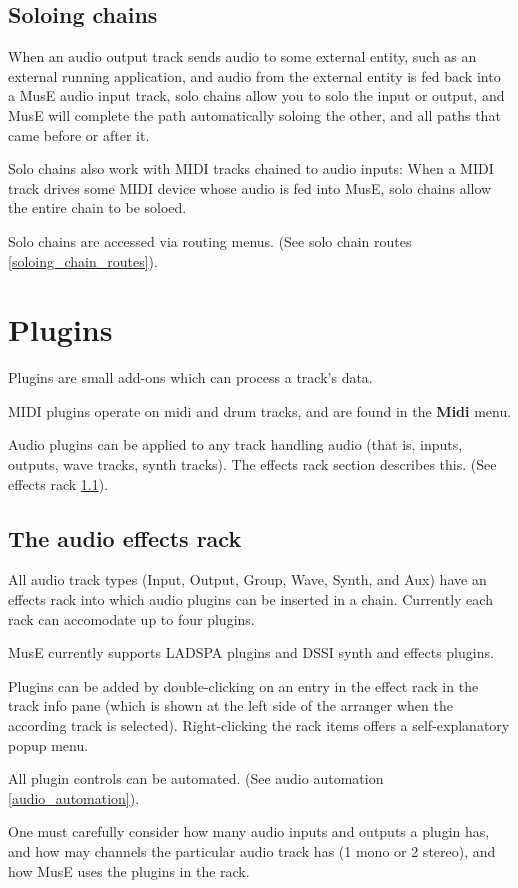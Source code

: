\documentclass[a4paper]{report}
\newcommand{\menu}[1]{\textbf{#1}}
\begin{document}
\subsection{Soloing chains} \label{soloing_chains}
When an audio output track sends audio to some external entity, such
as an external running application, and audio from the external entity
is fed back into a MusE audio input track, solo chains allow you to
solo the input or output, and MusE will complete the path automatically
soloing the other, and all paths that came before or after it.

Solo chains also work with MIDI tracks chained to audio inputs:
When a MIDI track drives some MIDI device whose audio is fed into MusE,
solo chains allow the entire chain to be soloed.

Solo chains are accessed via routing menus. (See solo chain routes
\ref{soloing_chain_routes}).

\section{Plugins} \label{plugins}
Plugins are small add-ons which can process a track's data.

MIDI plugins operate on midi and drum tracks, and are found in
the \menu{Midi} menu.

Audio plugins can be applied to any track handling audio (that is,
inputs, outputs, wave tracks, synth tracks). The effects rack
section describes this. (See effects rack \ref{effects_rack}).

\subsection{The audio effects rack} \label{effects_rack}
All audio track types (Input, Output, Group, Wave, Synth, and Aux) have
an effects rack into which audio plugins can be inserted in a chain.
Currently each rack can accomodate up to four plugins.

MusE currently supports LADSPA plugins and DSSI synth and effects
plugins.

Plugins can be added by double-clicking on an entry in the effect rack
in the track info pane (which is shown at the left side of the arranger
when the according track is selected). Right-clicking the rack items
offers a self-explanatory popup menu.

All plugin controls can be automated. (See audio automation
\ref{audio_automation}).

One must carefully consider how many audio inputs and outputs a plugin
has, and how may channels the particular audio track has (1 mono or
2 stereo), and how MusE uses the plugins in the rack.
\end{document}
